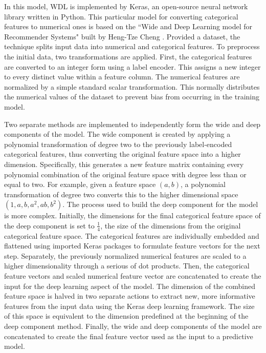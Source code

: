\documentclass[12pt,letterpaper]{article}
\theoremstyle{plain}
\theoremstyle{definition}
\begin{document}
In this model, WDL is implemented by Keras, an open-source neural network library written in Python. This particular model for converting categorical features to numerical ones is based on the ``Wide and Deep Learning model for Recommender Systems" built by Heng-Tze Cheng \cite{chengwidedeep2016}. Provided a dataset, the technique splits input data into numerical and categorical features. To preprocess the initial data, two transformations are applied. First, the categorical features are converted to an integer form using a label encoder. This assigns a new integer to every distinct value within a feature column. The numerical features are normalized by a simple standard scalar transformation. This normally distributes the numerical values of the dataset to prevent bias from occurring in the training model. 

Two separate methods are implemented to independently form the wide and deep components of the model. The wide component is created by applying a polynomial transformation of degree two to the previously label-encoded categorical features, thus converting the original feature space into a higher dimension. Specifically, this generates a new feature matrix containing every polynomial combination of the original feature space with degree less than or equal to two. For example, given a feature space $(a,b)$, a polynomial transformation of degree two converts this to the higher dimensional space $(1,a,b,a^2,ab,b^2)$. The process used to build the deep component for the model is more complex. Initially, the dimensions for the final categorical feature space of the deep component is set to $\frac{1}{4}$, the size of the dimensions from the original categorical feature space. The categorical features are individually embedded and flattened using imported Keras packages to formulate feature vectors for the next step. Separately, the previously normalized numerical features are scaled to a higher dimensionality through a serious of dot products. Then, the categorical feature vectors and scaled numerical feature vector are concatenated to create the input for the deep learning aspect of the model. The dimension of the combined feature space is halved in two separate actions to extract new, more informative features from the input data using the Keras deep learning framework. The size of this space is equivalent to the dimension predefined at the beginning of the deep component method. Finally, the wide and deep components of the model are concatenated to create the final feature vector used as the input to a predictive model. 
\end{document}
